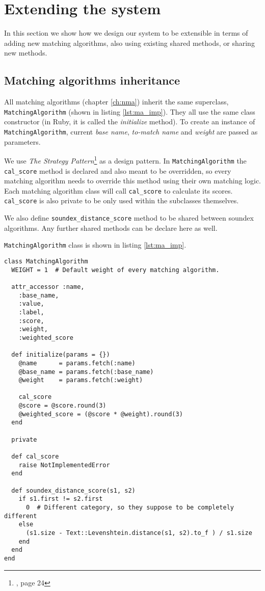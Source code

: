 \chapter{Extending the system}

In this section we show how we design our system to be extensible
in terms of adding new matching algorithms, also using existing
shared methods, or sharing new methods.

\section{Matching algorithms inheritance}

All matching algorithms (chapter \ref{ch:nma}) inherit the same superclass,\\
\texttt{MatchingAlgorithm} (shown in listing \ref{lst:ma_imp}). They all use the same class constructor
(in Ruby, it is called the \emph{initialize} method). To create an instance
of \texttt{MatchingAlgorithm}, current \emph{base name}, \emph{to-match name}
and \emph{weight} are passed as parameters.

We use \emph{The Strategy Pattern}\footnote{\cite[]{hf}, page 24}
as a design pattern. In \texttt{MatchingAlgorithm} the \texttt{cal\_score} method
is declared and also meant to be overridden, so every matching
algorithm needs to override this method using their own matching logic.
Each matching algorithm class will call \texttt{cal\_score}
to calculate its scores.
\texttt{cal\_score} is also private to be only used within the subclasses
themselves.

We also define \texttt{soundex\_distance\_score} method to be shared
between soundex algorithms. Any further shared methods can be declare
here as well.

\texttt{MatchingAlgorithm} class is shown in listing \ref{lst:ma_imp}.

\begin{minipage}{\linewidth}
\begin{lstlisting}[label={lst:ma_imp}, caption={\texttt{MatchingAlgorithm} class.}]
class MatchingAlgorithm
  WEIGHT = 1  # Default weight of every matching algorithm.

  attr_accessor :name,
    :base_name,
    :value,
    :label,
    :score,
    :weight,
    :weighted_score

  def initialize(params = {})
    @name      = params.fetch(:name)
    @base_name = params.fetch(:base_name)
    @weight    = params.fetch(:weight)

    cal_score
    @score = @score.round(3)
    @weighted_score = (@score * @weight).round(3)
  end

  private

  def cal_score
    raise NotImplementedError
  end

  def soundex_distance_score(s1, s2)
    if s1.first != s2.first
      0  # Different category, so they suppose to be completely different
    else
      (s1.size - Text::Levenshtein.distance(s1, s2).to_f ) / s1.size
    end
  end
end
\end{lstlisting}
\end{minipage}

